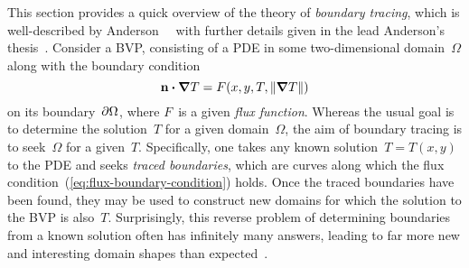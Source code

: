 This section provides a quick overview of
the theory of \emph{boundary tracing},
which is well-described by Anderson~\etal~\cite{}
with further details given in the lead Anderson's thesis~\cite{}.
Consider a BVP, consisting of
a PDE in some two-dimensional domain~$\Omega$
along with the boundary condition
\begin{equation}
  \mathop{}\!\boldsymbol{\mathrm{n}} \boldsymbol{\cdot} \mathop{}\!\boldsymbol{\mathrm{\nabla}} T = F (x, y, T, \lVert\mathop{}\!\boldsymbol{\mathrm{\nabla}} T\rVert)
  \label{eq:flux-boundary-condition}
\end{equation}
on its boundary~$\mathop{}\!\partial\Omega$,
where $F$~is a given \emph{flux function}.
Whereas the usual goal is
to determine the solution~$T$ for a given domain~$\Omega$,
the aim of boundary tracing is
to seek~$\Omega$ for a given~$T$.
Specifically, one takes any known solution~$T = T (x, y)$ to the PDE
and seeks \emph{traced boundaries}, which are curves
along which the flux condition~(\ref{eq:flux-boundary-condition}) holds.
Once the traced boundaries have been found,
they may be used to construct new domains
for which the solution to the BVP is also~$T$.
Surprisingly, this reverse problem
of determining boundaries from a known solution
often has infinitely many answers,
leading to far more new and interesting domain shapes
than expected~\cite{}.
